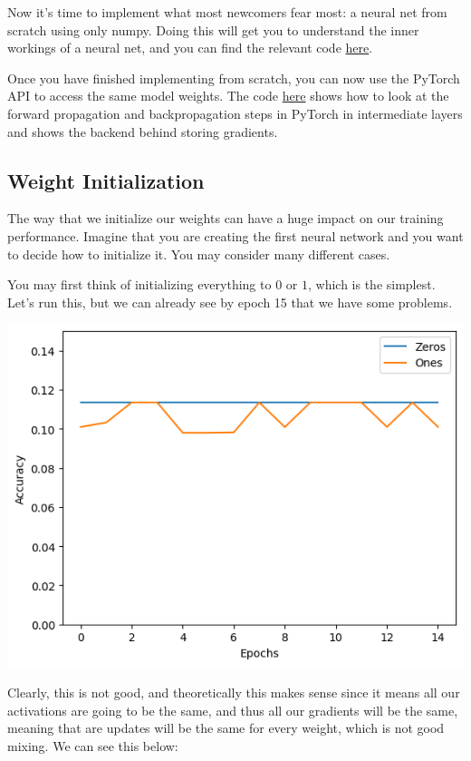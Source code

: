 \documentclass{article}
\begin{document}
    \begin{code}
      Now it's time to implement what most newcomers fear most: a neural net from scratch using only numpy. Doing this will get you to understand the inner workings of a neural net, and you can find the relevant code \href{code/mlp_from_scratch.ipynb}{here}.  
    \end{code} 

    \begin{code}
      Once you have finished implementing from scratch, you can now use the PyTorch API to access the same model weights. The code \href{code/forward_backward.ipynb}{here} shows how to look at the forward propagation and backpropagation steps in PyTorch in intermediate layers and shows the backend behind storing gradients. 
    \end{code}

  \subsection{Weight Initialization}

    The way that we initialize our weights can have a huge impact on our training performance. Imagine that you are creating the first neural network and you want to decide how to initialize it. You may consider many different cases. 

    \begin{example}
      You may first think of initializing everything to $0$ or $1$, which is the simplest. Let's run this, but we can already see by epoch 15 that we have some problems. 
      \begin{center}
        \includegraphics[scale=0.5]{img/01_MLP/first_initialize.png}
      \end{center}
      Clearly, this is not good, and theoretically this makes sense since it means all our activations are going to be the same, and thus all our gradients will be the same, meaning that are updates will be the same for every weight, which is not good mixing. We can see this below: 
    \end{example}
\end{document}
